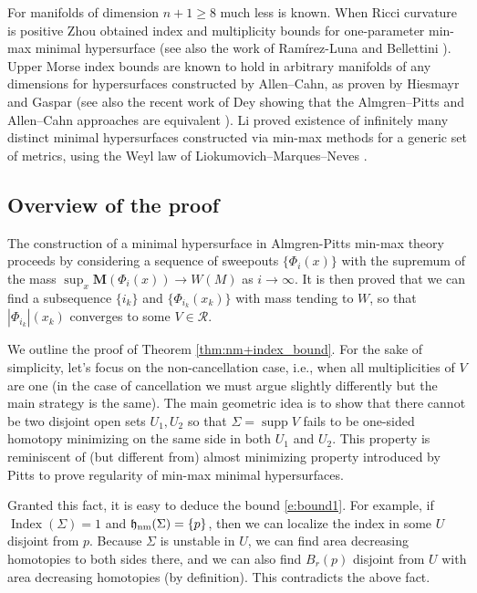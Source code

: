 \documentclass[12pt,twoside]{amsart}
\numberwithin{equation}{section}
\renewcommand{\geq}{\geqslant}
\renewcommand{\cR}{\mathcal R}
\newcommand{\bM}{\mathbf{M}}
\DeclareMathOperator{\supp}{supp}
\DeclareMathOperator{\Index}{Index}
\DeclareMathOperator{\hnm}{\mathfrak{h}_\textnormal{nm}}
\begin{document}
For manifolds of dimension $n+1\geq 8$ much less is known. 
When Ricci curvature is positive
Zhou obtained index and multiplicity bounds for one-parameter min-max minimal hypersurface \cite{Z17} (see also the work of  Ram\'irez-Luna \cite{RL} and Bellettini \cite{bellettini}). Upper Morse index bounds are known to hold in arbitrary manifolds of any dimensions for hypersurfaces constructed by Allen--Cahn, as proven by Hiesmayr and Gaspar \cite{Hiesmayr,Gaspar} (see also the recent work of Dey showing that the Almgren--Pitts and Allen--Cahn approaches are equivalent \cite{dey}). Li proved \cite{li2019} existence 
of infinitely many distinct minimal hypersurfaces constructed 
via min-max methods for a generic set of metrics, using the
Weyl law of Liokumovich--Marques--Neves \cite{LMN}.


\subsection{Overview of the proof}
The construction of a minimal hypersurface in Almgren-Pitts min-max theory proceeds by considering a sequence of sweepouts $\{ \Phi_i(x) \}$
with the supremum of the mass $\sup_x \bM(\Phi_i(x)) \rightarrow W(M)$ as $i \rightarrow \infty$.
It is then proved that we can find a subsequence $\{i_k\}$
and $\{\Phi_{i_k}(x_k) \}$ with mass tending
to $W$, so that $|\Phi_{i_k}|(x_k)$ converges to some $V \in \cR$.

We outline the proof of Theorem \ref{thm:nm+index_bound}.
For the sake of simplicity, let's focus on the non-cancellation case, i.e., when all multiplicities of $V$ are one (in the case of cancellation we must argue slightly differently but the main strategy is the same).
The main geometric idea is to show that there cannot be two disjoint open sets $U_1,U_2$ so that $\Sigma=\supp V$ fails to be one-sided homotopy minimizing on 
the same side in both $U_1$ and $U_2$. 
This property is reminiscent of (but different from) 
almost minimizing 
property introduced by Pitts to prove regularity
of min-max minimal hypersurfaces.

Granted this fact, it is easy to deduce the bound \eqref{e:bound1}. For example, if $\Index(\Sigma) = 1$ and $\hnm(\Sigma) = \{p\}$, then we can localize the index in some $U$ disjoint from $p$. Because $\Sigma$ is unstable in $U$, we can find area decreasing homotopies to both sides there, and we can also find $B_r(p)$ disjoint from $U$ with area decreasing homotopies (by definition). This contradicts the above fact. 
\end{document}
